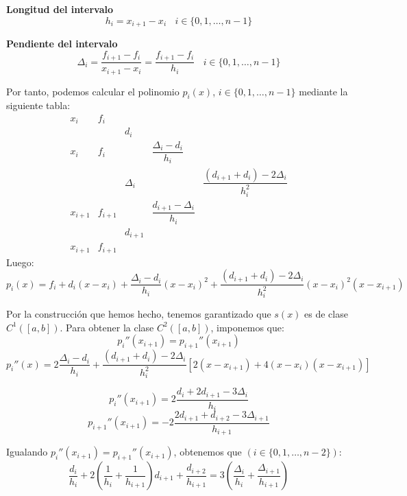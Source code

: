 \textbf{Longitud del intervalo}
$$h_i = x_{i+1}-x_i~~~~i \in \{0, 1, \ldots, n-1\}$$

\textbf{Pendiente del intervalo}
$$\Delta_i = \dfrac{f_{i+1}-f_i}{x_{i+1}-x_i} = \dfrac{f_{i+1}-f_i}{h_i}~~~~i \in \{0, 1, \ldots, n-1\}$$

\noindent
Por tanto, podemos calcular el polinomio $p_i(x)$, $i \in \{0, 1, \ldots, n-1\}$ mediante la siguiente tabla:
$$\begin{array}{c|cccc}
        x_i     & f_i     &          &                               &                                        \\
                &         & d_i      &                               &                                        \\
        x_i     & f_i     &          & \dfrac{\Delta_i-d_i}{h_i}     &                                        \\
                &         & \Delta_i &                               & \dfrac{(d_{i+1}+d_i)-2\Delta_i}{h_i^2} \\
        x_{i+1} & f_{i+1} &          & \dfrac{d_{i+1}-\Delta_i}{h_i} &                                        \\
                &         & d_{i+1}  &                               &                                        \\
        x_{i+1} & f_{i+1} &          &                               &
    \end{array}$$
Luego:
$$p_i(x) = f_i + d_i(x-x_i) + \dfrac{\Delta_i - d_i}{h_i}(x-x_i)^2 +
    \dfrac{(d_{i+1}+d_i)-2\Delta_i}{h_i^2}(x-x_i)^2 (x-x_{i+1})$$

\bigskip
\noindent
Por la construcción que hemos hecho, tenemos garantizado que $s(x)$ es de clase $C^1([a,b])$.\newline
Para obtener la clase $C^2([a,b])$, imponemos que:
$$p_i''(x_{i+1}) = p_{i+1}''(x_{i+1})$$
$$p_i''(x) = 2\dfrac{\Delta_i-d_i}{h_i} + \dfrac{(d_{i+1}+d_i)-2\Delta_i}{h_i^2} \left[2(x-x_{i+1}) +
    4(x-x_i)(x-x_{i+1})\right]$$

$$p_i''(x_{i+1}) = 2\dfrac{d_i+2d_{i+1}-3\Delta_i}{h_i}$$
$$p_{i+1}''(x_{i+1}) = -2 \dfrac{2d_{i+1}+d_{i+2}-3\Delta_{i+1}}{h_{i+1}}$$

\noindent
Igualando $p_i''(x_{i+1}) = p_{i+1}''(x_{i+1})$, obtenemos que $(i \in \{0,1,\ldots, n-2\})$:
$$\dfrac{d_i}{h_i} + 2\left(\dfrac{1}{h_i}+\dfrac{1}{h_{i+1}}\right) d_{i+1} + \dfrac{d_{i+2}}{h_{i+1}}
    = 3 \left( \dfrac{\Delta_i}{h_i} + \dfrac{\Delta_{i+1}}{h_{i+1}} \right)$$


